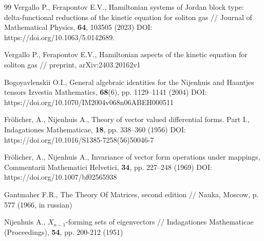 \documentclass[12pt]{article}
\theoremstyle{remark}
\begin{document}
\begin{thebibliography}{99}
 Vergallo P., Ferapontov E.V., Hamiltonian systems of Jordan block type: delta-functional reductions of the kinetic equation for soliton gas // Journal of Mathematical  Physics, \textbf{64}, 103505 (2023) DOI: https://doi.org/10.1063/5.0142689.

 Vergallo P., Ferapontov E.V., Hamiltonian aspects of the kinetic equation for soliton gas // preprint, arXiv:2403.20162v1

 Bogoyavlenskii O.I., General algebraic identities for the Nijenhuis and Haantjes tensors Izvestia Mathematics, \textbf{68}(6), pp. 1129–1141 (2004) DOI: https://doi.org/10.1070/IM2004v068n06ABEH000511

 Fr\"olicher, A., Nijenhuis A., Theory of vector valued differential forms. Part I., Indagationes Mathematicae, \textbf{18}, pp. 338–360 (1956) DOI: https://doi.org/10.1016/S1385-7258(56)50046-7

 Fr\"olicher, A., Nijenhuis A., Invariance of vector form operations under mappings, Commentarii Mathematici Helvetici, \textbf{34}, pp. 227–248 (1969) DOI: https://doi.org/10.1007/bf02565938

 Gantmaher F.R., The Theory Of Matrices, second edition // Nauka, Moscow, p. 577 (1966, in russian)

 Nijenhuis A., $X_{n - 1}$-forming sets of eigenvectors // Indagationes Mathematicae (Proceedings), \textbf{54}, pp. 200-212 (1951)
\end{thebibliography}
\end{document}
